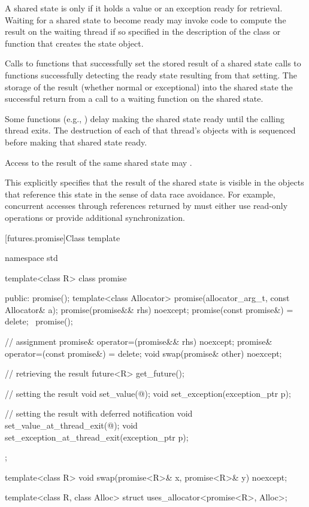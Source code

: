 \pnum
A shared state is  only if it holds a value or an exception ready for
retrieval.
Waiting for a shared state to become ready may invoke code to compute the result on
the waiting thread if so specified in the description of the class or function that creates
the state object.

\pnum
Calls to functions that successfully set the stored result of a shared
state  calls to functions
successfully detecting the ready state resulting from that setting.
The storage of the result
(whether normal or exceptional) into the shared state
the successful return from a call to a waiting function on the shared state.

\pnum
Some functions (e.g., ) delay making
the shared state ready until the calling thread exits. The destruction of
each of that thread's objects with 
is sequenced before making that shared state ready.

\pnum
Access to the result of the same shared state may .
\begin{note}
This explicitly specifies that the result of the shared state is
visible in the objects that reference this state in the sense of data race
avoidance. For example, concurrent accesses through
references returned by 
must either use read-only operations or provide additional synchronization.
\end{note}

[futures.promise]{Class template }

%
\begin{codeblock}
namespace std {
  template<class R>
  class promise {
  public:
    promise();
    template<class Allocator>
      promise(allocator_arg_t, const Allocator& a);
    promise(promise&& rhs) noexcept;
    promise(const promise&) = delete;
    ~promise();

    // assignment
    promise& operator=(promise&& rhs) noexcept;
    promise& operator=(const promise&) = delete;
    void swap(promise& other) noexcept;

    // retrieving the result
    future<R> get_future();

    // setting the result
    void set_value(@\seebelow@);
    void set_exception(exception_ptr p);

    // setting the result with deferred notification
    void set_value_at_thread_exit(@\seebelow@);
    void set_exception_at_thread_exit(exception_ptr p);
  };

  template<class R>
    void swap(promise<R>& x, promise<R>& y) noexcept;

  template<class R, class Alloc>
    struct uses_allocator<promise<R>, Alloc>;
}
\end{codeblock}

